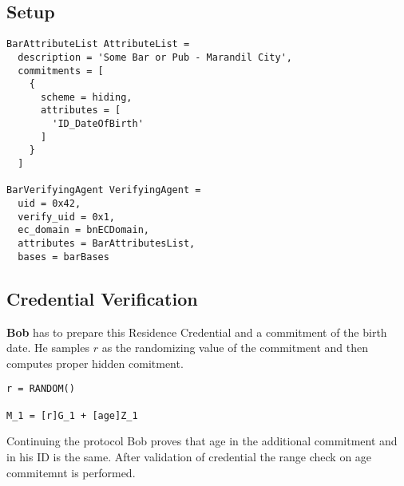 \subsection{Setup}

\small
\begin{verbatim}
BarAttributeList AttributeList =
  description = 'Some Bar or Pub - Marandil City',
  commitments = [
    {
      scheme = hiding,
      attributes = [
        'ID_DateOfBirth'
      ]
    }
  ]

BarVerifyingAgent VerifyingAgent =
  uid = 0x42,
  verify_uid = 0x1,
  ec_domain = bnECDomain,
  attributes = BarAttributesList,
  bases = barBases       
\end{verbatim}
\normalsize


\subsection{Credential Verification}

\textbf{Bob} has to prepare this Residence Credential and a commitment of the birth date.
He samples $r$ as the randomizing value of the commitment and then computes proper \textsf{hidden} comitment.

\begin{verbatim}
r = RANDOM()

M_1 = [r]G_1 + [age]Z_1
\end{verbatim}

Continuing the protocol Bob proves that age in the additional commitment and in his ID is the same. After validation of credential the range check on age commitemnt is performed.